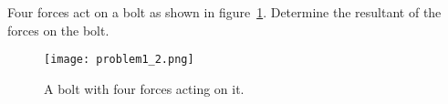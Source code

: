 Four forces act on a bolt as shown in figure~\ref{A1:fig:Q2}. Determine the resultant of the forces on the bolt.
\begin{figure}
	\centering
	\texttt{[image: problem1\_2.png]}
	\caption{A bolt with four forces acting on it.}
	\label{A1:fig:Q2}
\end{figure}